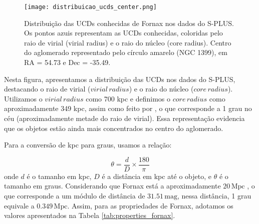 \begin{figure}[!ht]
    \begin{center}
    \texttt{[image: distribuicao\_ucds\_center.png]}
    \caption[]{Distribuição das UCDs conhecidas de Fornax nos dados do S-PLUS. Os pontos azuis representam as UCDs conhecidas, coloridas pelo raio de virial (virial radius) e o raio do núcleo (core radius). Centro do aglomerado representado pelo círculo amarelo (NGC 1399), em RA = 54.73 e Dec = -35.49.}
    \label{distribuicao_ucds_center}
    \end{center}
\end{figure}

Nesta figura, apresentamos a distribuição das UCDs nos dados do S-PLUS, destacando o raio de virial ($virial \, radius$) e o raio do núcleo ($core \, radius$). Utilizamos o $virial \, radius$ como 700 kpc \citep{Drinkwater_2001} e definimos o $core \, radius$ como aproximadamente 349 kpc, assim como feito por \cite{Saifollahi_2021}, o que corresponde a 1 grau no céu (aproximadamente metade do raio de virial). Essa representação evidencia que os objetos estão ainda mais concentrados no centro do aglomerado.

Para a conversão de kpc para graus, usamos a relação:

\begin{equation}
    \theta = \frac{d}{D} \times \frac{180}{\pi}
\end{equation}
onde $d$ é o tamanho em kpc, $D$ é a distância em kpc até o objeto, e $\theta$ é o tamanho em graus. Considerando que Fornax está a aproximadamente $20 \, \text{Mpc}$ \citep{Blakeslee_2009}, o que corresponde a um módulo de distância de $31.51 \, \text{mag}$, nessa distância, 1 grau equivale a $0.349 \, \text{Mpc}$. Assim, para as propriedades de Fornax, adotamos os valores apresentados na Tabela \ref{tab:properties_fornax}.



